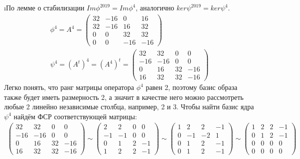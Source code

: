 \i По лемме о стабилизации $Im\phi^{2019} = Im\phi^4$, аналогично $ker\psi^{2019} = ker\psi^4$.
\begin{gather*}
    \phi^4 = A^4 = 
    \begin{pmatrix}
        32 & -16 & 0 & 16\\
        32 & -16 & 16 & 32\\
        0 & 0 & 32 & 32\\
        0 & 0 & -16 & -16
    \end{pmatrix}\\
    \psi^4 = (A^t)^4 = (A^4)^t = 
    \begin{pmatrix}
        32 & 32 & 0 & 0\\
        -16 & -16 & 0 & 0\\
        0 & 16 & 32 & -16\\
        16 & 32 & 32 & -16
    \end{pmatrix}
\end{gather*}
Легко понять, что ранг матрицы оператора $\phi^4$ равен 2, поэтому базис образа также будет иметь размерность 2, а значит в качестве него можно рассмотреть любые 2 линейно независимые столбца, например, 2 и 3. Чтобы найти базис ядра $\psi^4$ найдём ФСР соответствующей матрицы:
\begin{gather*}
    \begin{pmatrix}
        32 & 32 & 0 & 0\\
        -16 & -16 & 0 & 0\\
        0 & 16 & 32 & -16\\
        16 & 32 & 32 & -16
    \end{pmatrix} \sim
    \begin{pmatrix}
        2 & 2 & 0 & 0\\
        -1 & -1 & 0 & 0\\
        0 & 1 & 2 & -1\\
        1 & 2 & 2 & -1
    \end{pmatrix} \sim
    \begin{pmatrix}
        1 & 2 & 2 & -1\\
        0 & -1 & -2 & 1\\
        0 & 1 & 2 & -1\\
        0 & 1 & 2 & -1
    \end{pmatrix} \sim 
    \begin{pmatrix}
        1 & 2 & 2 & -1\\
        0 & 1 & 2 & -1\\
        0 & 0 & 0 & 0\\
        0 & 0 & 0 & 0
    \end{pmatrix}
\end{gather*}
